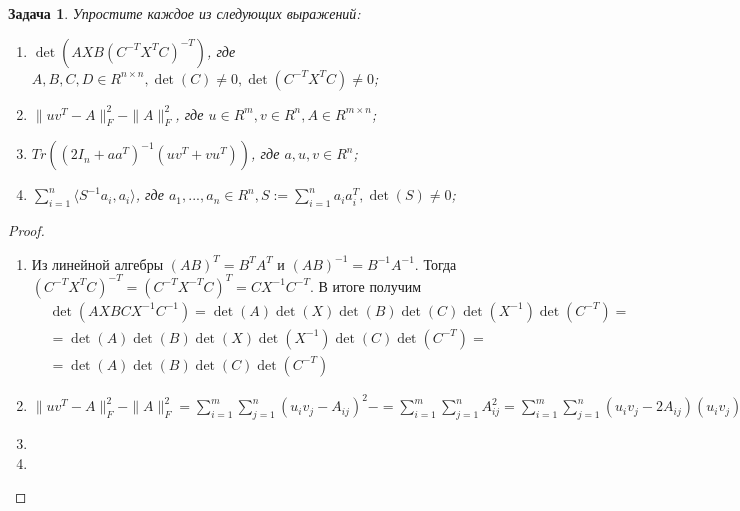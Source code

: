 \documentclass[a4paper]{article}
\newtheorem{problem}{Задача}
\begin{document}
\begin{problem} Упростите каждое из следующих выражений:
	\begin{enumerate}[label=(\alph*)]
		\item $\det(A X B(C^{-T}X^TC)^{-T})$, где $A, B, C, D \in R^{n \times n}, \det(C) \neq 0, \det(C^{-T}X^TC) \neq 0$;
		\item $\|u v^T-A\|_F^2-\|A\|_F^2$, где $u \in R^m, v \in R^n, A \in R^{m \times n}$;
		\item $Tr((2I_n+a a^T)^{-1}(u v^T+v u^T))$, где $a, u, v \in R^n$;
		\item  $\sum _{i=1}^n\langle S^{-1}a_i,a_i\rangle$, где $a_1, ..., a_n \in R^n, S := \sum _{i=1}^n a_i a_i^T, \det(S) \neq 0$;
	\end{enumerate}
\end{problem}
\begin{proof}
\begin{enumerate}[label=(\alph*)]
\item Из линейной алгебры $(AB)^T = B^TA^T$ и $(AB)^{-1} = B^{-1}A^{-1}$. Тогда
$(C^{-T}X^TC)^{-T} = (C^{-T}X^{-T}C)^T = C X^{-1}C^{-T}$.
В итоге получим
\begin{align*}
&\det(A X B C X^{-1}C^{-1}) = \det(A)\det(X)\det(B)\det(C)\det(X^{-1})\det(C^{-T}) = \\ &= \det(A)\det(B)\det(X)\det(X^{-1})\det(C)\det(C^{-T}) = \\ &= \det(A)\det(B)\det(C)\det(C^{-T})
\end{align*}
\item $\|u v^T-A\|_F^2-\|A\|_F^2 = \sum _{i=1}^m \sum _{j=1}^n (u_i v_j - A_{i j})^2 - = \sum _{i=1}^m \sum _{j=1}^n A_{i j}^2 = \sum _{i=1}^m \sum _{j=1}^n(u_i v_j - 2A_{i j})(u_i v_j) = \sum _{i=1}^m \sum _{j=1}^n u_i^2 v_j^2 - \sum _{i=1}^m \sum _{j=1}^n 2u_i A_{i j}  v_j = \langle u, u \rangle \langle v, v \rangle - 2\langle v u^T, A \rangle$
\item
\item
\end{enumerate}
\end{proof}
\end{document}
